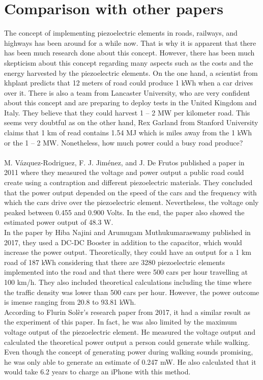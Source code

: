 \chapter{Comparison with other papers}

The concept of implementing piezoelectric elements in roads, railways, and highways has been around for a while now. That is why it is apparent that there has been much research done about this concept. However, there has been much skepticism about this concept regarding many aspects such as the costs and the energy harvested by the piezoelectric elements. On the one hand, a scientist from khplant predicts that 12 meters of road could produce 1 kWh when a car drives over it. There is also a team from Lancaster University, who are very confident about this concept and are preparing to deploy tests in the United Kingdom and Italy. They believe that they could harvest 1 – 2 MW per kilometer road. This seems very doubtful as on the other hand, Rex Garland from Stanford University claims that 1 km of read contains 1.54 MJ which is miles away from the 1 kWh or the 1 – 2 MW. Nonetheless, how much power could a busy road produce?\\
\\
M. Vázquez-Rodriguez, F. J. Jiménez, and J. De Frutos published a paper in 2011 where they measured the voltage and power output a public road could create using a contraption and different piezoelectric materials. They concluded that the power output depended on the speed of the cars and the frequency with which the cars drive over the piezoelectric element. Nevertheless, the voltage only peaked between 0.455 and 0.900 Volts. In the end, the paper also showed the estimated power output of 48.3 W. \\
In the paper by Hiba Najini and Arumugam Muthukumaraswamy published in 2017, they used a DC-DC Booster in addition to the capacitor, which would increase the power output. Theoretically, they could have an output for a 1 km road of 187 kWh considering that there are 3280 piezoelectric elements implemented into the road and that there were 500 cars per hour travelling at 100 km/h. They also included theoretical calculations including the time where the traffic density was lower than 500 cars per hour. However, the power outcome is imense ranging from 20.8 to 93.81 kWh. \\
According to Flurin Solèr's research paper from 2017, it had a similar result as the experiment of this paper. In fact, he was also limited by the maximum voltage output of the piezoelectric element. He measured the voltage output and calculated the theoretical power output a person could generate while walking. Even though the concept of generating power during walking sounds promising, he was only able to generate an estimate of 0.247 mW. He also calculated that it would take 6.2 years to charge an iPhone with this method.\\